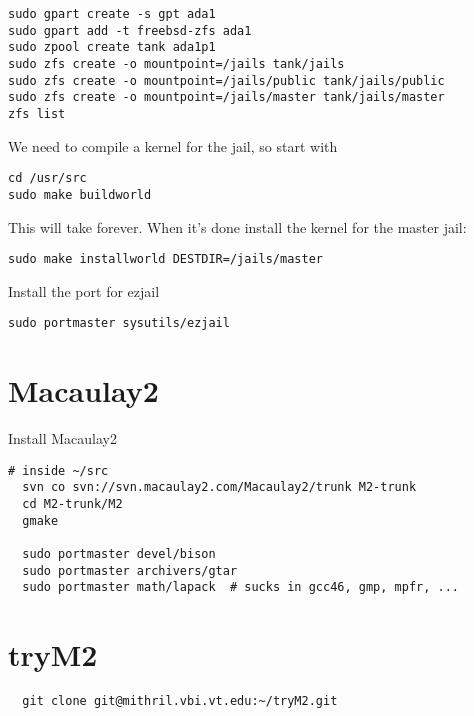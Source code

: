 \documentclass[a4paper]{article}
\begin{document}
\begin{verbatim}
sudo gpart create -s gpt ada1
sudo gpart add -t freebsd-zfs ada1
sudo zpool create tank ada1p1
sudo zfs create -o mountpoint=/jails tank/jails
sudo zfs create -o mountpoint=/jails/public tank/jails/public
sudo zfs create -o mountpoint=/jails/master tank/jails/master
zfs list
\end{verbatim}


We need to compile a kernel for the jail, so start with

\begin{verbatim}
cd /usr/src
sudo make buildworld
\end{verbatim}

This will take forever.
When it's done install the kernel for the master jail:

\begin{verbatim}
sudo make installworld DESTDIR=/jails/master
\end{verbatim}

Install the port for ezjail

\begin{verbatim}
sudo portmaster sysutils/ezjail
\end{verbatim}

\section{Macaulay2}
Install Macaulay2

\begin{verbatim}
# inside ~/src
  svn co svn://svn.macaulay2.com/Macaulay2/trunk M2-trunk
  cd M2-trunk/M2
  gmake

  sudo portmaster devel/bison
  sudo portmaster archivers/gtar
  sudo portmaster math/lapack  # sucks in gcc46, gmp, mpfr, ...
\end{verbatim}

\section{tryM2}
\begin{verbatim}
  git clone git@mithril.vbi.vt.edu:~/tryM2.git
\end{verbatim}
\end{document}
